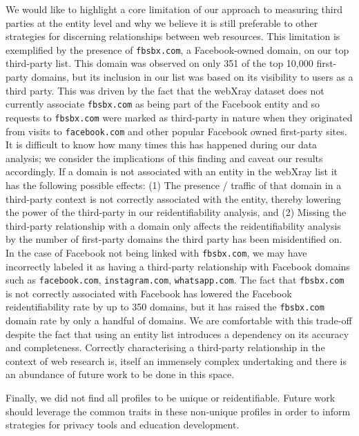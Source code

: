\documentclass[letterpaper,twocolumn,10pt]{article}
\begin{document}
We would like to highlight a core limitation of our approach to measuring third parties at the entity level and why we believe it is still preferable to other strategies for discerning relationships between web resources. 
This limitation is exemplified by the presence of \texttt{fbsbx.com}, a Facebook-owned domain, on our top third-party list.
This domain was observed on only 351 of the top 10,000 first-party domains, but its inclusion in our list was based on its visibility to users as a third party. 
This was driven by the fact that the webXray dataset does not currently associate \texttt{fbsbx.com} as being part of the Facebook entity and so requests to \texttt{fbsbx.com} were marked as third-party in nature when they originated from visits to \texttt{facebook.com} and other popular Facebook owned first-party sites.
It is difficult to know how many times this has happened during our data analysis; we consider the implications of this finding and caveat our results accordingly. 
If a domain is not associated with an entity in the webXray list it has the following possible effects: (1) The presence / traffic of that domain in a third-party context is not correctly associated with the entity, thereby lowering the power of the third-party in our reidentifiability analysis, and (2) Missing the third-party relationship with a domain only affects the reidentifiability analysis by the number of first-party domains the third party has been misidentified on. 
In the case of Facebook not being linked with \texttt{fbsbx.com}, we may have incorrectly labeled it as having a third-party relationship with Facebook domains such as \texttt{facebook.com}, \texttt{instagram.com}, \texttt{whatsapp.com}. 
The fact that \texttt{fbsbx.com} is not correctly associated with Facebook has lowered the Facebook reidentifiability rate by up to 350 domains, but it has raised the \texttt{fbsbx.com} domain rate by only a handful of domains. We are comfortable with this trade-off despite the fact that using an entity list introduces a dependency on its accuracy and completeness. 
Correctly characterising a third-party relationship in the context of web research is, itself an immensely complex undertaking and there is an abundance of future work to be done in this space.  

Finally, we did not find all profiles to be unique or reidentifiable. Future work should leverage the common traits in these non-unique profiles in order to inform strategies for privacy tools and education development.
\end{document}
